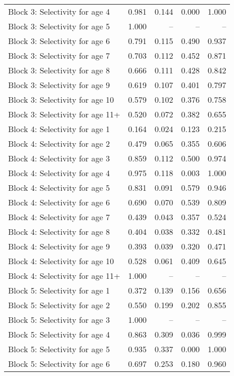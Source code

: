 \documentclass[
]{article}
\begin{document}
\begin{landscape}
\begin{longtable}[t]{lrrrr}
\addlinespace
Block 3: Selectivity for age 4 & 0.981 & 0.144 & 0.000 & 1.000\\
Block 3: Selectivity for age 5 & 1.000 & -- & -- & --\\
Block 3: Selectivity for age 6 & 0.791 & 0.115 & 0.490 & 0.937\\
Block 3: Selectivity for age 7 & 0.703 & 0.112 & 0.452 & 0.871\\
Block 3: Selectivity for age 8 & 0.666 & 0.111 & 0.428 & 0.842\\
\addlinespace
Block 3: Selectivity for age 9 & 0.619 & 0.107 & 0.401 & 0.797\\
Block 3: Selectivity for age 10 & 0.579 & 0.102 & 0.376 & 0.758\\
Block 3: Selectivity for age 11+ & 0.520 & 0.072 & 0.382 & 0.655\\
Block 4: Selectivity for age 1 & 0.164 & 0.024 & 0.123 & 0.215\\
Block 4: Selectivity for age 2 & 0.479 & 0.065 & 0.355 & 0.606\\
\addlinespace
Block 4: Selectivity for age 3 & 0.859 & 0.112 & 0.500 & 0.974\\
Block 4: Selectivity for age 4 & 0.975 & 0.118 & 0.003 & 1.000\\
Block 4: Selectivity for age 5 & 0.831 & 0.091 & 0.579 & 0.946\\
Block 4: Selectivity for age 6 & 0.690 & 0.070 & 0.539 & 0.809\\
Block 4: Selectivity for age 7 & 0.439 & 0.043 & 0.357 & 0.524\\
\addlinespace
Block 4: Selectivity for age 8 & 0.404 & 0.038 & 0.332 & 0.481\\
Block 4: Selectivity for age 9 & 0.393 & 0.039 & 0.320 & 0.471\\
Block 4: Selectivity for age 10 & 0.528 & 0.061 & 0.409 & 0.645\\
Block 4: Selectivity for age 11+ & 1.000 & -- & -- & --\\
Block 5: Selectivity for age 1 & 0.372 & 0.139 & 0.156 & 0.656\\
\addlinespace
Block 5: Selectivity for age 2 & 0.550 & 0.199 & 0.202 & 0.855\\
Block 5: Selectivity for age 3 & 1.000 & -- & -- & --\\
Block 5: Selectivity for age 4 & 0.863 & 0.309 & 0.036 & 0.999\\
Block 5: Selectivity for age 5 & 0.935 & 0.337 & 0.000 & 1.000\\
Block 5: Selectivity for age 6 & 0.697 & 0.253 & 0.180 & 0.960\\

\end{longtable}
\end{landscape}
\end{document}

